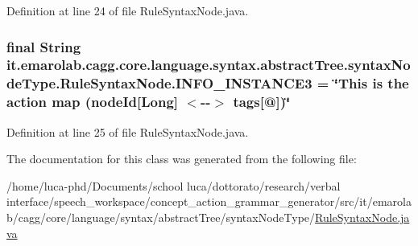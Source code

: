 Definition at line 24 of file Rule\-Syntax\-Node.\-java.

\hypertarget{classit_1_1emarolab_1_1cagg_1_1core_1_1language_1_1syntax_1_1abstractTree_1_1syntaxNodeType_1_1RuleSyntaxNode_aea4983c9ca522dd17e1525ce217128f0}{
\subsubsection[{I\-N\-F\-O\-\_\-\-I\-N\-S\-T\-A\-N\-C\-E3}]{\setlength{\rightskip}{0pt plus 5cm}final String it.\-emarolab.\-cagg.\-core.\-language.\-syntax.\-abstract\-Tree.\-syntax\-Node\-Type.\-Rule\-Syntax\-Node.\-I\-N\-F\-O\-\_\-\-I\-N\-S\-T\-A\-N\-C\-E3 = \char`\"{}This is the action map (node\-Id\mbox{[}Long\mbox{]} $<$-\/-\/$>$ tags\mbox{[}@\mbox{]})\char`\"{}\hspace{0.3cm}{\ttfamily [static]}}}\label{classit_1_1emarolab_1_1cagg_1_1core_1_1language_1_1syntax_1_1abstractTree_1_1syntaxNodeType_1_1RuleSyntaxNode_aea4983c9ca522dd17e1525ce217128f0}


Definition at line 25 of file Rule\-Syntax\-Node.\-java.



The documentation for this class was generated from the following file\-:\begin{DoxyCompactItemize}
\item 
/home/luca-\/phd/\-Documents/school luca/dottorato/research/verbal interface/speech\-\_\-workspace/concept\-\_\-action\-\_\-grammar\-\_\-generator/src/it/emarolab/cagg/core/language/syntax/abstract\-Tree/syntax\-Node\-Type/\hyperlink{RuleSyntaxNode_8java}{Rule\-Syntax\-Node.\-java}\end{DoxyCompactItemize}
